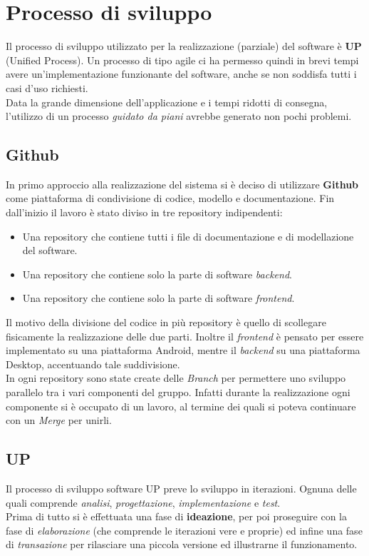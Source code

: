 \chapter{Processo di sviluppo}
Il processo di sviluppo utilizzato per la realizzazione (parziale) del software è \textbf{UP} (Unified Process). Un processo di tipo agile ci ha permesso quindi in brevi tempi avere un'implementazione funzionante del software, anche se non soddisfa tutti i casi d'uso richiesti.
\\Data la grande dimensione dell'applicazione e i tempi ridotti di consegna, l'utilizzo di un processo \textit{guidato da piani} avrebbe generato non pochi problemi.

\section{Github}
In primo approccio alla realizzazione del sistema si è deciso di utilizzare \textbf{Github} come piattaforma di condivisione di codice, modello e documentazione. Fin dall'inizio il lavoro è stato diviso in tre repository indipendenti:
\begin{itemize}
	\item Una repository che contiene tutti i file di documentazione e di modellazione del software.
	\item Una repository che contiene solo la parte di software \textit{backend}. 
	\item Una repository che contiene solo la parte di software \textit{frontend}.
\end{itemize}
Il motivo della divisione del codice in più repository è quello di scollegare fisicamente la realizzazione delle due parti. Inoltre il \textit{frontend} è pensato per essere implementato su una piattaforma Android, mentre il \textit{backend} su una piattaforma Desktop, accentuando tale suddivisione.
\\In ogni repository sono state create delle \textit{Branch} per permettere uno sviluppo parallelo tra i vari componenti del gruppo. Infatti durante la realizzazione ogni componente si è occupato di un lavoro, al termine dei quali si poteva continuare con un \textit{Merge} per unirli.

\section{UP}
Il processo di sviluppo software UP preve lo sviluppo in iterazioni. Ognuna delle quali comprende \textit{analisi}, \textit{progettazione}, \textit{implementazione} e \textit{test}.
\\Prima di tutto si è effettuata una fase di \textbf{ideazione}, per poi proseguire con la fase di \textit{elaborazione} (che comprende le iterazioni vere e proprie) ed infine una fase di \textit{transazione} per rilasciare una piccola versione ed illustrarne il funzionamento.

